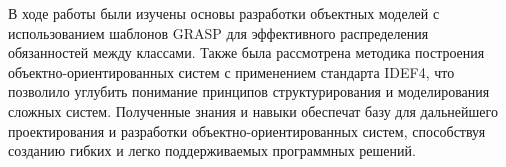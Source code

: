 В ходе работы были изучены основы разработки объектных моделей с использованием
шаблонов GRASP для эффективного распределения обязанностей между классами. Также
была рассмотрена методика построения объектно-ориентированных систем с
применением стандарта IDEF4, что позволило углубить понимание принципов
структурирования и моделирования сложных систем. Полученные знания и навыки
обеспечат базу для дальнейшего проектирования и разработки
объектно-ориентированных систем, способствуя созданию гибких и легко
поддерживаемых программных решений.
